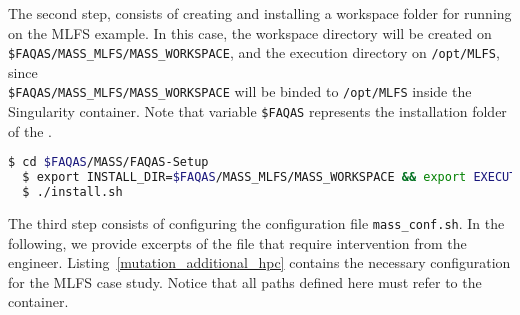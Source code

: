 The second step, consists of creating and installing a workspace folder for running \MASS on the MLFS example. In this case, the workspace directory will be created on \\\texttt{\$FAQAS/MASS\_MLFS/MASS\_WORKSPACE}, and the execution directory on \texttt{/opt/MLFS}, since \\\texttt{\$FAQAS/MASS\_MLFS/MASS\_WORKSPACE} will be binded to \texttt{/opt/MLFS} inside the Singularity container.
Note that variable \texttt{\$FAQAS} represents the installation folder of the \FAQAS.

\begin{lstlisting}[language=bash]
  $ cd $FAQAS/MASS/FAQAS-Setup
  $ export INSTALL_DIR=$FAQAS/MASS_MLFS/MASS_WORKSPACE && export EXECUTION_DIR=/opt/MLFS 
  $ ./install.sh
\end{lstlisting}

The third step consists of configuring the \MASS configuration file \texttt{mass\_conf.sh}. In the following, we provide excerpts of the file that require intervention from the engineer. Listing~\ref{mutation_additional_hpc} contains the necessary configuration for the MLFS case study.
Notice that all paths defined here must refer to the container.

